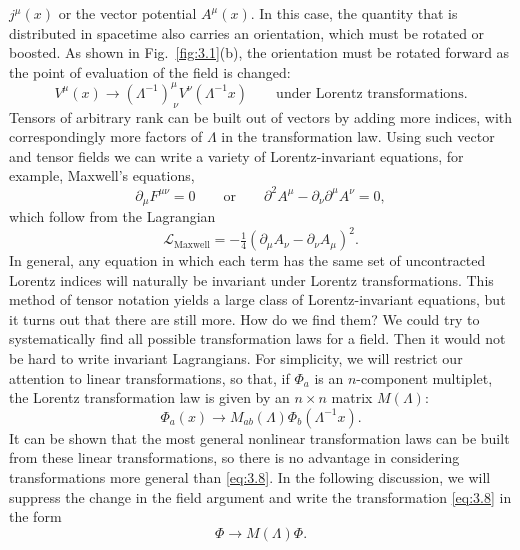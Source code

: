 $j^\mu(x)$ or the vector potential $A^\mu(x)$.  In this case, the quantity
that is distributed in spacetime also carries an orientation, which must be
rotated or boosted.  As shown in Fig.~\ref{fig:3.1}(b), the orientation must
be rotated forward as the point of evaluation of the field is changed:
\begin{equation}
  V^\mu(x) \to (\Lambda^{-1})^{\mu}_{\ \nu}V^\nu(\Lambda^{-1}x)
  \qquad\text{under Lorentz transformations}.
\end{equation}
Tensors of arbitrary rank can be built out of vectors by adding more
indices, with correspondingly more factors of $\Lambda$ in the
transformation law.  Using such vector and tensor fields we can write a
variety of Lorentz-invariant equations, for example, Maxwell's equations,
\begin{equation}
  \partial_\mu F^{\mu\nu} = 0
  \qquad\text{or}\qquad
  \partial^2 A^\mu - \partial_\nu\partial^\mu A^\nu = 0,
  \label{eq:3.6}
\end{equation}
which follow from the Lagrangian
\begin{equation}
  \mathcal{L}_{\mathrm{Maxwell}} =
    -\tfrac{1}{4}(\partial_\mu A_\nu - \partial_\nu A_\mu)^2 .
  \label{eq:3.7}
\end{equation}
In general, any equation in which each term has the same set of uncontracted
Lorentz indices will naturally be invariant under Lorentz transformations.
This method of tensor notation yields a large class of Lorentz-invariant
equations, but it turns out that there are still more.  How do we find them?
We could try to systematically find all possible transformation laws for a
field.  Then it would not be hard to write invariant Lagrangians.  For
simplicity, we will restrict our attention to linear transformations, so
that, if $\Phi_a$ is an $n$-component multiplet, the Lorentz transformation
law is given by an $n\times n$ matrix $M(\Lambda)$:
\begin{equation}
  \Phi_a(x) \to M_{ab}(\Lambda)\Phi_b(\Lambda^{-1}x).
  \label{eq:3.8}
\end{equation}
It can be shown that the most general nonlinear transformation laws can be
built from these linear transformations, so there is no advantage in
considering transformations more general than \eqref{eq:3.8}.  In the
following discussion, we will suppress the change in the field argument and
write the transformation \eqref{eq:3.8} in the form
\begin{equation}
  \Phi \to M(\Lambda)\Phi .
  \label{eq:3.9}
\end{equation}
